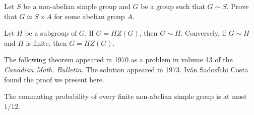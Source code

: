 \begin{exercise}
\label{xca:isoclinism_simple}
    Let $S$ be a non-abelian simple group and
    $G$ be a group such that $G\sim S$. Prove that 
    $G\simeq S\times A$ for some abelian group $A$.
\end{exercise}

\begin{exercise}
\label{xca:isoclinism_factorization}
    Let $H$ be a subgroup of $G$. If $G=HZ(G)$, then $G\sim H$. 
    Conversely, if $G\sim H$ and $H$ is finite, then 
    $G=HZ(G)$. 
\end{exercise}

The following theorem appeared in 1970 as a problem in 
volume 13 of the \textit{Canadian Math. Bulletin}. The solution
appeared in 1973. 
Iv\'an Sadosfchi Costa found the proof we present here. 

\begin{theorem}[Dixon]
    The commuting probability of every finite 
    non-abelian simple group is at most $1/12$. 
\end{theorem}

